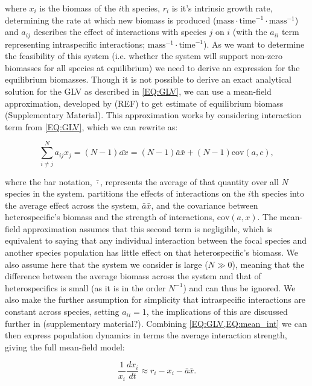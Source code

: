 \documentclass{article}
\begin{document}
where $x_i$ is the biomass of the $i$th species, $r_i$ is it's intrinsic growth rate, determining the rate at which new biomass is produced ($\text{mass} \cdot \text{time}^{-1} \cdot \text{mass}^{-1} $) and $a_{ij}$ describes the effect of interactions with species $j$ on $i$ (with the $a_{ii}$ term representing intraspecific interactions; $\text{mass}^{-1} \cdot \text{time}^{-1}$). As we want to determine the feasibility of this system (i.e. whether the system will support non-zero biomasses for all species at equilibrium) we need to derive an expression for the equilibrium biomasses. Though it is not possible to derive an exact analytical solution for the GLV as described in \cref{EQ:GLV}, we can use a mean-field approximation, developed by (REF) to get estimate of equilibrium biomass (Supplementary Material). This approximation works by considering interaction term from \cref{EQ:GLV}, which we can rewrite as:

\begin{equation} \label{EQ:mean_int} 
    \sum^N_{i \neq j} a_{ij} x_j = (N-1) \bar{a x} = (N-1) \bar{a} \bar{x} + (N-1) \text{cov}(a,c),
\end{equation}

where the bar notation, $\bar{\cdot}$, represents the average of that quantity over all $N$ species in the system.  partitions the effects of interactions on the $i$th species into the average effect across the system, $\bar{a} \bar{x}$, and the covariance between heterospecific's biomass and the strength of interactions, $\text{cov}(a,x)$. The mean-field approximation assumes that this second term is negligible, which is equivalent to saying that any individual interaction between the focal species and another species population has little effect on that heterospecific's biomass. We also assume here that the system we consider is large ($N \gg 0$), meaning that the difference between the average biomass across the system and that of heterospecifics is small (as it is in the order $N^{-1}$) and can thus be ignored. We also make the further assumption for simplicity that intraspecific interactions are constant across species, setting $a_{ii} = 1$, the implications of this are discussed further in (supplementary material?). Combining \cref{EQ:GLV,EQ:mean_int}  we can then express population dynamics in terms the average interaction strength, giving the full mean-field model:

\begin{equation} \label{EQ:MF}
    \frac{1}{x_i} \frac{dx_i}{dt} \approx r_i - x_i - \bar{a}\bar{x}.
\end{equation}
\end{document}
